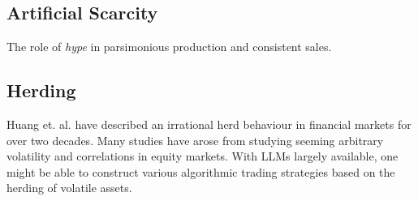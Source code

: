 \documentclass[11pt]{article}
\begin{document}
\subsection{Artificial Scarcity}
The role of \textit{hype} in parsimonious production and consistent sales.
\subsection{Herding}
Huang et. al. \cite{huang_2015_herd} have described an irrational herd behaviour in financial markets for over two decades. Many studies have arose from studying seeming arbitrary volatility and correlations in equity markets. With LLMs largely available, one might be able to construct various algorithmic trading strategies based on the herding of volatile assets.
\newpage
\printbibliography
{}
\end{document}

